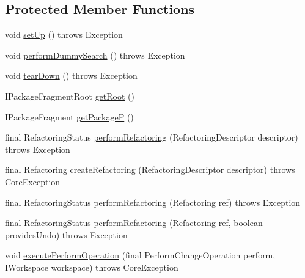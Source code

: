 \subsection*{Protected Member Functions}
\begin{DoxyCompactItemize}
\item 
void \hyperlink{classorg_1_1eclipse_1_1jdt_1_1ui_1_1tests_1_1refactoring_1_1infra_1_1RefactoringTest_a66bfdf7082095826be91b1c57297f5ea}{setUp} ()  throws Exception 
\item 
void \hyperlink{classorg_1_1eclipse_1_1jdt_1_1ui_1_1tests_1_1refactoring_1_1infra_1_1RefactoringTest_a49cee59d63df61565a84ebf904b88f37}{performDummySearch} ()  throws Exception 
\item 
void \hyperlink{classorg_1_1eclipse_1_1jdt_1_1ui_1_1tests_1_1refactoring_1_1infra_1_1RefactoringTest_a7ed749a8aeaa13885963d3b6f3e2cdb3}{tearDown} ()  throws Exception 
\item 
IPackageFragmentRoot \hyperlink{classorg_1_1eclipse_1_1jdt_1_1ui_1_1tests_1_1refactoring_1_1infra_1_1RefactoringTest_aadc3164623457edcbf5487dfb01d90dd}{getRoot} ()
\item 
IPackageFragment \hyperlink{classorg_1_1eclipse_1_1jdt_1_1ui_1_1tests_1_1refactoring_1_1infra_1_1RefactoringTest_a111ea9121b3023c91496ac174bb47abb}{getPackageP} ()
\item 
final RefactoringStatus \hyperlink{classorg_1_1eclipse_1_1jdt_1_1ui_1_1tests_1_1refactoring_1_1infra_1_1RefactoringTest_af3c98926e4cb24ac14ab2aaf5af6a24e}{performRefactoring} (RefactoringDescriptor descriptor)  throws Exception 
\item 
final Refactoring \hyperlink{classorg_1_1eclipse_1_1jdt_1_1ui_1_1tests_1_1refactoring_1_1infra_1_1RefactoringTest_a5f3200063173e8792276cb004a8122e1}{createRefactoring} (RefactoringDescriptor descriptor)  throws CoreException 
\item 
final RefactoringStatus \hyperlink{classorg_1_1eclipse_1_1jdt_1_1ui_1_1tests_1_1refactoring_1_1infra_1_1RefactoringTest_a8634d45c776ed0361a3f9957eec7ecb4}{performRefactoring} (Refactoring ref)  throws Exception 
\item 
final RefactoringStatus \hyperlink{classorg_1_1eclipse_1_1jdt_1_1ui_1_1tests_1_1refactoring_1_1infra_1_1RefactoringTest_aa9b9bdac4349cfaee64f002e10397035}{performRefactoring} (Refactoring ref, boolean providesUndo)  throws Exception 
\item 
void \hyperlink{classorg_1_1eclipse_1_1jdt_1_1ui_1_1tests_1_1refactoring_1_1infra_1_1RefactoringTest_a2a8e4b9697941006d7b56c3ff4f37e37}{executePerformOperation} (final PerformChangeOperation perform, IWorkspace workspace)  throws CoreException 

\end{DoxyCompactItemize}
